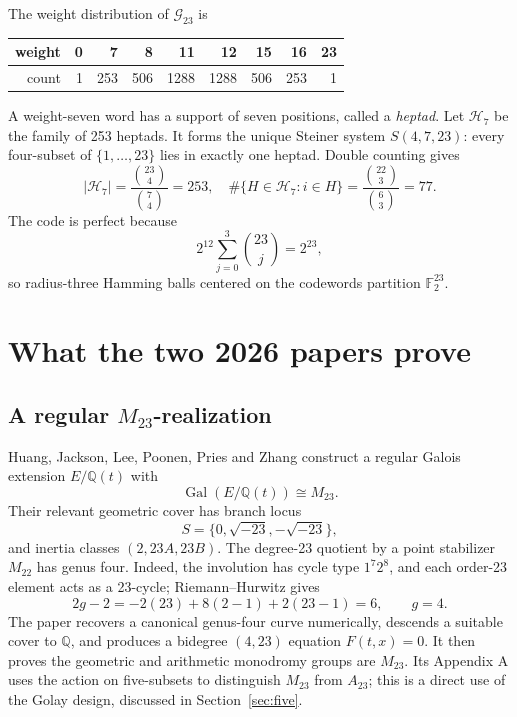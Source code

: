 \documentclass[11pt,letterpaper]{article}
\theoremstyle{definition}
\newcommand{\QQ}{\mathbb{Q}}
\newcommand{\FF}{\mathbb{F}}
\newcommand{\Gal}{\operatorname{Gal}}
\newcommand{\G}{\mathcal{G}_{23}}
\newcommand{\oct}{\mathcal{H}_7}
\begin{document}
The weight distribution of \(\G\) is
\begin{center}
\begin{tabular}{@{}rrrrrrrrr@{}}\toprule
weight & 0 & 7 & 8 & 11 & 12 & 15 & 16 & 23\\\midrule
count & 1 & 253 & 506 & 1288 & 1288 & 506 & 253 & 1\\\bottomrule
\end{tabular}
\end{center}
A weight-seven word has a support of seven positions, called a \emph{heptad}. Let \(\oct\) be the family of 253 heptads. It forms the unique Steiner system \(S(4,7,23)\): every four-subset of \(\{1,\ldots,23\}\) lies in exactly one heptad. Double counting gives
\[
|\oct|=\frac{\binom{23}{4}}{\binom74}=253,\quad
\#\{H\in\oct:i\in H\}=\frac{\binom{22}{3}}{\binom63}=77.
\]
The code is perfect because
\[
2^{12}\sum_{j=0}^3\binom{23}{j}=2^{23},
\]
so radius-three Hamming balls centered on the codewords partition \(\FF_2^{23}\).

\section{What the two 2026 papers prove}
\subsection{A regular \(M_{23}\)-realization}
Huang, Jackson, Lee, Poonen, Pries and Zhang \cite{HJLPPZ26} construct a regular Galois extension \(E/\QQ(t)\) with
\[
\Gal(E/\QQ(t))\cong M_{23}.
\]
Their relevant geometric cover has branch locus
\[
S=\{0,\sqrt{-23},-\sqrt{-23}\},
\]
and inertia classes \((2,23A,23B)\). The degree-23 quotient by a point stabilizer \(M_{22}\) has genus four. Indeed, the involution has cycle type \(1^7 2^8\), and each order-23 element acts as a 23-cycle; Riemann--Hurwitz gives
\[
2g-2=-2(23)+8(2-1)+2(23-1)=6,\qquad g=4.
\]
The paper recovers a canonical genus-four curve numerically, descends a suitable cover to \(\QQ\), and produces a bidegree \((4,23)\) equation \(F(t,x)=0\). It then proves the geometric and arithmetic monodromy groups are \(M_{23}\). Its Appendix A uses the action on five-subsets to distinguish \(M_{23}\) from \(A_{23}\); this is a direct use of the Golay design, discussed in Section~\ref{sec:five}.
\end{document}

